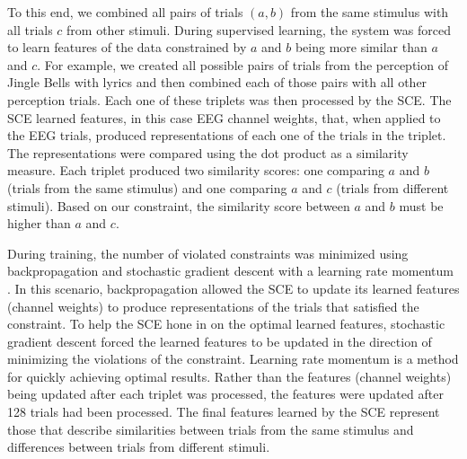 To this end, we combined all pairs of trials $(a,b)$ from the same stimulus with all trials $c$ from other stimuli.
During supervised learning, the system was forced to learn features of the data constrained by $a$ and $b$ being more similar than $a$ and $c$. 
For example, we created all possible pairs of trials from the perception of Jingle Bells with lyrics and then combined each of those pairs with all other perception trials.
Each one of these triplets was then processed by the \ac{SCE}. %
The \ac{SCE} learned features, in this case EEG channel weights, that, when applied to the EEG trials, produced representations of each one of the trials in the triplet. 
The representations were compared using the dot product as a similarity measure. 
Each triplet produced two similarity scores: one comparing $a$ and $b$ (trials from the same stimulus) and one comparing $a$ and $c$ (trials from different stimuli).
Based on our constraint, the similarity score between $a$ and $b$ must be higher than $a$ and $c$.

During training, the number of violated constraints was minimized using backpropagation and stochastic gradient descent with a learning rate momentum \cite{rumelhart1988learning}.
In this scenario, backpropagation allowed the \ac{SCE} to update its learned features (channel weights) to produce representations of the trials that satisfied the constraint. 
To help the \ac{SCE} hone in on the optimal learned features, stochastic gradient descent forced the learned features to be updated in the direction of minimizing the violations of the constraint. 
Learning rate momentum is a method for quickly achieving optimal results. Rather than the features (channel weights) being updated after each triplet was processed, the features were updated after 128 trials had been processed.
The final features learned by the \ac{SCE} represent those that describe similarities between trials from the same stimulus and differences between trials from different stimuli.  

